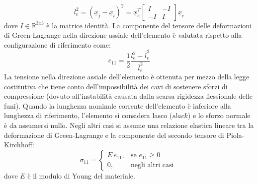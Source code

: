 \begin{equation}
   l_e^2 = \left( \underline{x}_j - \underline{x}_i \right)^2 =  \underline{x}_e^T 
   \begin{bmatrix}
    I & -I \\
    -I &  I 
   \end{bmatrix} \underline{x}_e
   \label{eq:lunghezza_elemento_quadro}
\end{equation}
dove $I \in \mathbb{R}^{3x3}$ è la matrice identità. La componente del tensore delle deformazioni di Green-Lagrange nella direzione assiale dell'elemento è valutata rispetto alla configurazione di riferimento come: 
\begin{equation}
   e_{11} = \frac{1}{2}\frac{l_e^2 - \overline{l}_e^2}{\overline{l}_e^2}
   \label{eq:deformazione_green_lagrange}
\end{equation}
La tensione nella direzione assiale dell'elemento è ottenuta per mezzo della legge costitutiva che tiene conto dell'impossibilità dei cavi di sostenere sforzi di compressione (dovuto all'instabilità causata dalla scarsa rigidezza flessionale delle funi). Quando la lunghezza nominale corrente dell'elemento è inferiore alla lunghezza di riferimento, l'elemento si considera lasco ($slack$) e lo sforzo normale è da assumersi nullo. Negli altri casi si assume una relazione elastica lineare tra la deformazione di Green-Lagrange e la componente del secondo tensore di Piola-Kirchhoff:
\begin{equation}
   \sigma_{11} =
\begin{cases}
E \, e_{11}, & \text{se } e_{11} \geq 0 \\[6pt]
0, & \text{negli altri casi } 
\end{cases}
\label{eq:tension_only2}
\end{equation}
dove $E$ è il modulo di Young del materiale. 

